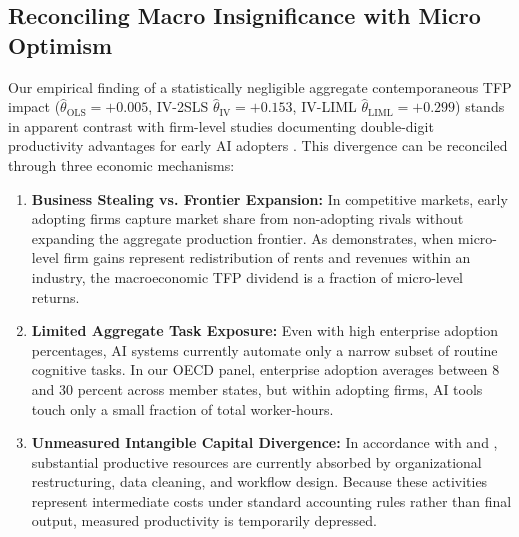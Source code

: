 \documentclass[11pt,a4paper]{article}
\begin{document}
\subsection{Reconciling Macro Insignificance with Micro Optimism}
Our empirical finding of a statistically negligible aggregate contemporaneous TFP impact ($\hat{\theta}_{\text{OLS}} = +0.005$, IV-2SLS $\hat{\theta}_{\text{IV}} = +0.153$, IV-LIML $\hat{\theta}_{\text{LIML}} = +0.299$) stands in apparent contrast with firm-level studies documenting double-digit productivity advantages for early AI adopters \citep{brynjolfsson2023, babina2024}. This divergence can be reconciled through three economic mechanisms:
\begin{enumerate}
    \item \textbf{Business Stealing vs. Frontier Expansion:} In competitive markets, early adopting firms capture market share from non-adopting rivals without expanding the aggregate production frontier. As \citet{acemoglu2024} demonstrates, when micro-level firm gains represent redistribution of rents and revenues within an industry, the macroeconomic TFP dividend is a fraction of micro-level returns.
    \item \textbf{Limited Aggregate Task Exposure:} Even with high enterprise adoption percentages, AI systems currently automate only a narrow subset of routine cognitive tasks. In our OECD panel, enterprise adoption averages between 8 and 30 percent across member states, but within adopting firms, AI tools touch only a small fraction of total worker-hours.
    \item \textbf{Unmeasured Intangible Capital Divergence:} In accordance with \citet{corrado2021} and \citet{brynjolfsson2021}, substantial productive resources are currently absorbed by organizational restructuring, data cleaning, and workflow design. Because these activities represent intermediate costs under standard accounting rules rather than final output, measured productivity is temporarily depressed.
\end{enumerate}
\end{document}
